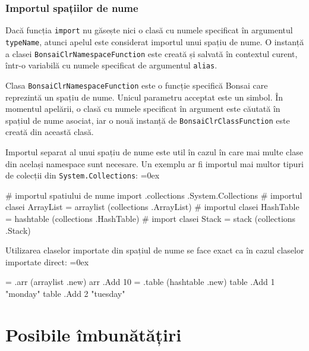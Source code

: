 \documentclass[12pt,a4paper]{memoir}
\renewcommand{\c}{\texttt}
\newenvironment{code}
{
\definecolor{shadecolor}{gray}{0.91}
\topsep=0ex
\relax
\shaded
\verbatim
}
{
\endverbatim
\endshaded
}
\begin{document}
\subsection{Importul spațiilor de nume}

Dacă funcția \c{import} nu găsește nici o clasă cu numele specificat în argumentul \c{typeName}, atunci apelul este considerat importul unui spațiu de nume. O instanță a clasei \c{BonsaiClrNamespaceFunction} este creată și salvată în contextul curent, într-o variabilă cu numele specificat de argumentul \c{alias}.

Clasa \c{BonsaiClrNamespaceFunction} este o funcție specifică Bonsai care reprezintă un spațiu de nume. Unicul parametru acceptat este un simbol. În momentul apelării, o clasă cu numele specificat în argument este căutată în spațiul de nume asociat, iar o nouă instanță de \c{BonsaiClrClassFunction} este creată din această clasă.

Importul separat al unui spațiu de nume este util în cazul în care mai multe clase din același namespace sunt necesare. Un exemplu ar fi importul mai multor tipuri de colecții din \c{System.Collections}:
\begin{code}
# importul spatiului de nume 
import .collections .System.Collections
# importul clasei ArrayList
= arraylist (collections .ArrayList)
# importul clasei HashTable
= hashtable (collections .HashTable)
# import clasei Stack
= stack (collections .Stack)
\end{code}

Utilizarea claselor importate din spațiul de nume se face exact ca în cazul claselor importate direct:
\begin{code}
= .arr (arraylist .new)
arr .Add 10
= .table (hashtable .new)
table .Add 1 "monday"
table .Add 2 "tuesday"
\end{code}


\chapter{Posibile îmbunătățiri}
\end{document}
